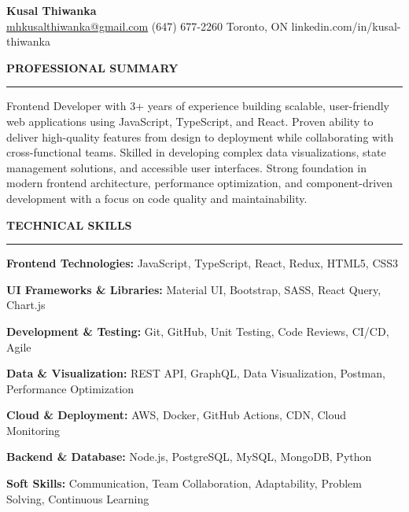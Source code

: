 \documentclass[10pt,letterpaper]{article}
\begin{document}
\begin{center}
{\LARGE\textbf{Kusal Thiwanka}}\\[3pt]
\href{mailto:mhkusalthiwanka@gmail.com}{mhkusalthiwanka@gmail.com}\hspace{2em}%
(647) 677{-}2260\hspace{2em}%
Toronto, ON\hspace{2em}
linkedin.com/in/kusal-thiwanka
\end{center}

\vspace{6pt}

\textbf{PROFESSIONAL SUMMARY}\\[-8pt]
\noindent\rule{\textwidth}{1pt}

\vspace{-2pt}

Frontend Developer with 3+ years of experience building scalable, user-friendly web applications using JavaScript, TypeScript, and React. Proven ability to deliver high-quality features from design to deployment while collaborating with cross-functional teams. Skilled in developing complex data visualizations, state management solutions, and accessible user interfaces. Strong foundation in modern frontend architecture, performance optimization, and component-driven development with a focus on code quality and maintainability.

\vspace{8pt}

\textbf{TECHNICAL SKILLS}\\[-8pt]
\noindent\rule{\textwidth}{1pt}

\vspace{-2pt}

\textbf{Frontend Technologies:} JavaScript, TypeScript, React, Redux, HTML5, CSS3

\textbf{UI Frameworks \& Libraries:} Material UI, Bootstrap, SASS, React Query, Chart.js

\textbf{Development \& Testing:} Git, GitHub, Unit Testing, Code Reviews, CI/CD, Agile

\textbf{Data \& Visualization:} REST API, GraphQL, Data Visualization, Postman, Performance Optimization

\textbf{Cloud \& Deployment:} AWS, Docker, GitHub Actions, CDN, Cloud Monitoring

\textbf{Backend \& Database:} Node.js, PostgreSQL, MySQL, MongoDB, Python

\textbf{Soft Skills:} Communication, Team Collaboration, Adaptability, Problem Solving, Continuous Learning
\end{document}

